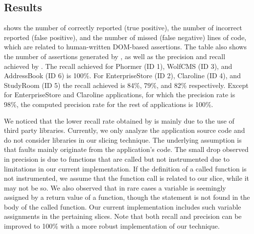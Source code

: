 \subsection{Results} \label{Sec:results}
 shows the number of  correctly reported (true positive), the number of incorrect reported (false positive), and the number of missed (false negative) \javascript lines of code, which are related to human-written DOM-based assertions. The table also shows the number of assertions generated by \tool, as well as the precision and recall achieved by \tool. The recall achieved for Phormer (ID 1), WolfCMS (ID 3), and AddressBook (ID 6) is 100\%. For EnterpriseStore (ID 2), Claroline (ID 4), and StudyRoom (ID 5) the recall achieved is 84\%, 79\%, and 82\% respectively. Except for EnterpriseStore and Claroline applications, for which the precision rate is 98\%, the computed precision rate for the rest of applications is 100\%.

We noticed that the lower recall rate obtained by \tool is mainly due to the use of third party libraries. Currently, we only analyze the application source code and do not consider libraries in our slicing technique. The underlying assumption is that faults mainly originate from the application's code. The small drop observed in precision is due to functions that are called but not instrumented due to limitations in our current implementation. If the definition of a called function is not instrumented, we assume that the function call is related to our slice, while it may not be so. 
We also observed that in rare cases a variable is seemingly assigned by a return value of a function, though the  statement is not found in the body of the called function. Our current implementation includes such variable assignments in the pertaining slices. 
Note that both recall and precision can be improved to 100\% with a more robust implementation of our technique. 

